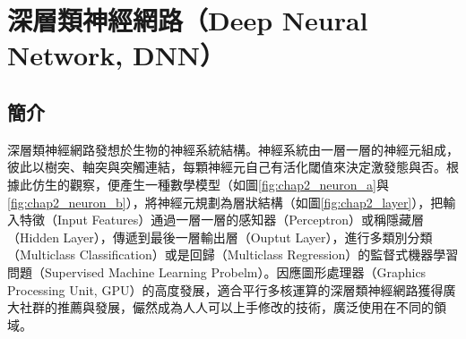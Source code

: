 \section{深層類神經網路（Deep Neural Network, DNN）}    
\subsection{簡介}
深層類神經網路發想於生物的神經系統結構。神經系統由一層一層的神經元組成，彼此以樹突、軸突與突觸連結，每顆神經元自己有活化閾值來決定激發態與否。根據此仿生的觀察，便產生一種數學模型（如圖\ref{fig:chap2_neuron_a}與\ref{fig:chap2_neuron_b}），將神經元規劃為層狀結構（如圖\ref{fig:chap2_layer}），把輸入特徵（Input Features）通過一層一層的感知器（Perceptron）或稱隱藏層（Hidden Layer），傳遞到最後一層輸出層（Ouptut Layer），進行多類別分類（Multiclass Classification）或是回歸（Multiclass Regression）的監督式機器學習問題（Supervised Machine Learning Probelm）。因應圖形處理器（Graphics Processing Unit, GPU）的高度發展，適合平行多核運算的深層類神經網路獲得廣大社群的推薦與發展，儼然成為人人可以上手修改的技術，廣泛使用在不同的領域。

